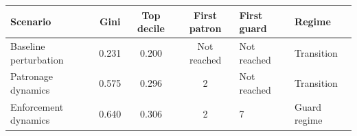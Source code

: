 \begin{tabular}{lcccll}
\toprule
Scenario & Gini & Top decile & First patron & First guard & Regime \\
\midrule
Baseline perturbation & 0.231 & 0.200 & Not reached & Not reached & Transition \\
Patronage dynamics & 0.575 & 0.296 & 2 & Not reached & Transition \\
Enforcement dynamics & 0.640 & 0.306 & 2 & 7 & Guard regime \\
\bottomrule
\end{tabular}
